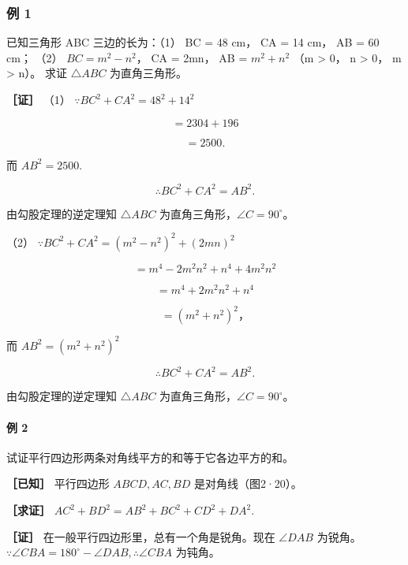 \subsubsection{例 1}

已知三角形 ABC 三边的长为：（1） BC = 48 cm， CA = 14 cm， AB = 60 cm；
（2） \(BC = m^{2} - n^{2}\)， CA = 2mn， AB = \(m^{2} + n^{2}\) （m
\textgreater{} 0， n \textgreater{} 0， m \textgreater{} n）。 求证
\(\triangle ABC\) 为直角三角形。

\textbf{［证］} （1） \(\because BC^{2} + CA^{2} = 48^{2} + 14^{2}\)

\[
= 2304 + 196
\]

\[
= 2500.
\]

而 \(AB^{2} = 2500.\)

\[
\therefore B C ^ {2} + C A ^ {2} = A B ^ {2}.
\]

由勾股定理的逆定理知 \(\triangle ABC\)
为直角三角形，\(\angle C = 90^{\circ}\)。

（2） \(\because BC^{2} + CA^{2} = (m^{2} - n^{2})^{2} + (2mn)^{2}\)

\[
= m ^ {4} - 2 m ^ {2} n ^ {2} + n ^ {4} + 4 m ^ {2} n ^ {2}
\]

\[
= m ^ {4} + 2 m ^ {2} n ^ {2} + n ^ {4}
\]

\[
= (m ^ {2} + n ^ {2}) ^ {2}\text{，}
\]

而 \(AB^{2} = (m^{2} + n^{2})^{2}\)

\[
\therefore B C ^ {2} + C A ^ {2} = A B ^ {2}.
\]

由勾股定理的逆定理知 \(\triangle ABC\)
为直角三角形，\(\angle C = 90^{\circ}\)。

\paragraph{例 2}

试证平行四边形两条对角线平方的和等于它各边平方的和。

\textbf{［已知］} 平行四边形 \(ABCD, AC, BD\) 是对角线（图2·20）。

\textbf{［求证］} \(AC^2 + BD^2 = AB^2 + BC^2 + CD^2 + DA^2.\)

\textbf{［证］} 在一般平行四边形里，总有一个角是锐角。现在
\(\angle DAB\) 为锐角。
\(\because \angle CBA = 180^{\circ} - \angle DAB, \therefore \angle CBA\)
为钝角。

